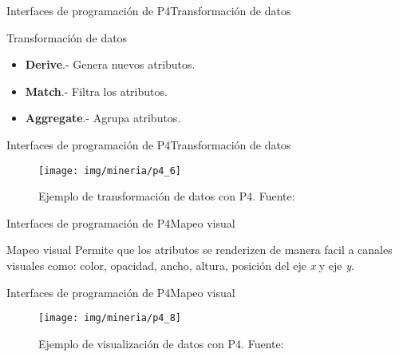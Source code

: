 \documentclass[10pt]{beamer}
\newcommand{\1}{
	\setbeamertemplate{background}{
		\texttt{[image: img/1]}
		\tikz[overlay] \fill[fill opacity=0.75,fill=white] (0,0) rectangle (-\paperwidth,\paperheight);
	}
}
\begin{document}
\begin{frame}{Interfaces de programación de P4}{Transformación de datos}
\begin{block}{Transformación de datos}
	\begin{itemize}
		\item \textbf{Derive}.- Genera nuevos atributos. 
		\item \textbf{Match}.- Filtra los  atributos.
		\item \textbf{Aggregate}.- Agrupa atributos. 
	\end{itemize}
\end{block}	
\end{frame}

\begin{frame}{Interfaces de programación de P4}{Transformación de datos}
\begin{figure}[]
	\centering
	\texttt{[image: img/mineria/p4\_6]}
	\caption{Ejemplo de transformación de datos con P4. Fuente: \cite{li2018p4}}
\end{figure}
\end{frame}

\begin{frame}{Interfaces de programación de P4}{Mapeo visual}
\begin{block}{Mapeo visual}
	Permite que los atributos se renderizen de manera facil a canales visuales como: color, opacidad, ancho, altura, posición del eje \textit{x} y eje \textit{y}.
\end{block}	
\end{frame}

\begin{frame}{Interfaces de programación de P4}{Mapeo visual}
\begin{figure}[]
	\centering
	\texttt{[image: img/mineria/p4\_8]}
	\caption{Ejemplo de visualización de datos con P4. Fuente: \cite{li2018p4}}
\end{figure}
\end{frame}
\end{document}
